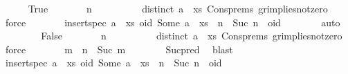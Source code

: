 \begin{isabellebody}
\ \ \ \ \isamarkupfalse%
\ True\isanewline
\ \ \ \ \isamarkupfalse%
\ \isamarkupfalse%
\ {\isachardoublequoteopen}n\ {\isacharequal}\ {}{\isachardoublequoteclose}\isanewline
\ \ \ \ \ \ \isamarkupfalse%
\ {\isacartoucheopen}distinct\ {\isacharparenleft}a\ {\isacharhash}\ xs{\isacharparenright}{\isacartoucheclose}\ Cons{\isachardot}prems{\isacharparenleft}{}{\isacharparenright}\ gr{\isacharunderscore}implies{\isacharunderscore}not{\isacharunderscore}zero\ \isamarkupfalse%
\ force\isanewline
\ \ \ \ \isamarkupfalse%
\ \isamarkupfalse%
\ {\isachardoublequoteopen}insert{\isacharunderscore}spec\ {\isacharparenleft}a\ {\isacharhash}\ xs{\isacharparenright}\ {\isacharparenleft}oid{\isacharcomma}\ Some\ {\isacharparenleft}{\isacharparenleft}a\ {\isacharhash}\ xs{\isacharparenright}\ {\isacharbang}\ n{\isacharparenright}{\isacharparenright}\ {\isacharbang}\ Suc\ n\ {\isacharequal}\ oid{\isachardoublequoteclose}\isanewline
\ \ \ \ \ \ \isamarkupfalse%
\ auto\isanewline
\ \ \isamarkupfalse%
\isanewline
\ \ \ \ \isamarkupfalse%
\ False\isanewline
\ \ \ \ \isamarkupfalse%
\ \isamarkupfalse%
\ {\isachardoublequoteopen}n\ {\isachargreater}\ {}{\isachardoublequoteclose}\isanewline
\ \ \ \ \ \ \isamarkupfalse%
\ {\isacartoucheopen}distinct\ {\isacharparenleft}a\ {\isacharhash}\ xs{\isacharparenright}{\isacartoucheclose}\ Cons{\isachardot}prems{\isacharparenleft}{}{\isacharparenright}\ gr{\isacharunderscore}implies{\isacharunderscore}not{\isacharunderscore}zero\ \isamarkupfalse%
\ force\isanewline
\ \ \ \ \isamarkupfalse%
\ \isamarkupfalse%
\ m\ \ {\isachardoublequoteopen}n\ {\isacharequal}\ Suc\ m{\isachardoublequoteclose}\isanewline
\ \ \ \ \ \ \isamarkupfalse%
\ Suc{\isacharunderscore}pred{\isacharprime}\ \isamarkupfalse%
\ blast\isanewline
\ \ \ \ \isamarkupfalse%
\ \isamarkupfalse%
\ {\isachardoublequoteopen}insert{\isacharunderscore}spec\ {\isacharparenleft}a\ {\isacharhash}\ xs{\isacharparenright}\ {\isacharparenleft}oid{\isacharcomma}\ Some\ {\isacharparenleft}{\isacharparenleft}a\ {\isacharhash}\ xs{\isacharparenright}\ {\isacharbang}\ n{\isacharparenright}{\isacharparenright}\ {\isacharbang}\ Suc\ n\ {\isacharequal}\ oid{\isachardoublequoteclose}\isanewline
\ \ \ \ \ \ \isamarkupfalse%

\end{isabellebody}
